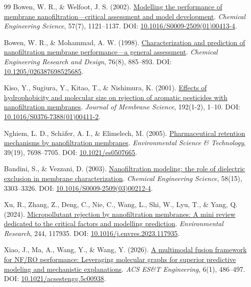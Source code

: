 \documentclass[11pt]{article}
\begin{document}
\begin{thebibliography}{99}
 Bowen, W. R., \& Welfoot, J. S. (2002). \href{https://doi.org/10.1016/S0009-2509(01)00413-4}{Modelling the performance of membrane nanofiltration---critical assessment and model development}. \textit{Chemical Engineering Science}, 57(7), 1121--1137. DOI: \href{https://doi.org/10.1016/S0009-2509(01)00413-4}{10.1016/S0009-2509(01)00413-4}.

 Bowen, W. R., \& Mohammad, A. W. (1998). \href{https://doi.org/10.1205/026387698525685}{Characterization and prediction of nanofiltration membrane performance---a general assessment}. \textit{Chemical Engineering Research and Design}, 76(8), 885--893. DOI: \href{https://doi.org/10.1205/026387698525685}{10.1205/026387698525685}.

 Kiso, Y., Sugiura, Y., Kitao, T., \& Nishimura, K. (2001). \href{https://doi.org/10.1016/S0376-7388(01)00411-2}{Effects of hydrophobicity and molecular size on rejection of aromatic pesticides with nanofiltration membranes}. \textit{Journal of Membrane Science}, 192(1-2), 1--10. DOI: \href{https://doi.org/10.1016/S0376-7388(01)00411-2}{10.1016/S0376-7388(01)00411-2}.

 Nghiem, L. D., Sch\"afer, A. I., \& Elimelech, M. (2005). \href{https://doi.org/10.1021/es0507665}{Pharmaceutical retention mechanisms by nanofiltration membranes}. \textit{Environmental Science \& Technology}, 39(19), 7698--7705. DOI: \href{https://doi.org/10.1021/es0507665}{10.1021/es0507665}.

 Bandini, S., \& Vezzani, D. (2003). \href{https://doi.org/10.1016/S0009-2509(03)00212-4}{Nanofiltration modeling: the role of dielectric exclusion in membrane characterization}. \textit{Chemical Engineering Science}, 58(15), 3303--3326. DOI: \href{https://doi.org/10.1016/S0009-2509(03)00212-4}{10.1016/S0009-2509(03)00212-4}.

 Xu, R., Zhang, Z., Deng, C., Nie, C., Wang, L., Shi, W., Lyu, T., \& Yang, Q. (2024). \href{https://doi.org/10.1016/j.envres.2023.117935}{Micropollutant rejection by nanofiltration membranes: A mini review dedicated to the critical factors and modelling prediction}. \textit{Environmental Research}, 244, 117935. DOI: \href{https://doi.org/10.1016/j.envres.2023.117935}{10.1016/j.envres.2023.117935}.

 Xiao, J., Ma, A., Wang, Y., \& Wang, Y. (2026). \href{https://doi.org/10.1021/acsestengg.5c00938}{A multimodal fusion framework for NF/RO performance: Leveraging molecular graphs for superior predictive modeling and mechanistic explanations}. \textit{ACS ES\&T Engineering}, 6(1), 486--497. DOI: \href{https://doi.org/10.1021/acsestengg.5c00938}{10.1021/acsestengg.5c00938}.


\end{thebibliography}
\end{document}
